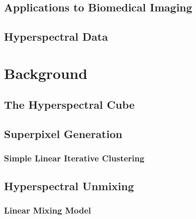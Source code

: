 \documentclass[10pt]{article}
\begin{document}
\subsection{Applications to Biomedical Imaging}
\subsection{Hyperspectral Data}

\clearpage
% 
% 
% 
% 
% 
\section{Background} \label{Background}

% 
\subsection{The Hyperspectral Cube} \label{Cube}


\clearpage
\subsection{Superpixel Generation} \label{Superpixel}

\subsubsection{Simple Linear Iterative Clustering} \label{SLIC}


\clearpage
\subsection{Hyperspectral Unmixing} \label{Unmixing Intro}

\subsubsection{Linear Mixing Model}\label{LMM}

\end{document}

